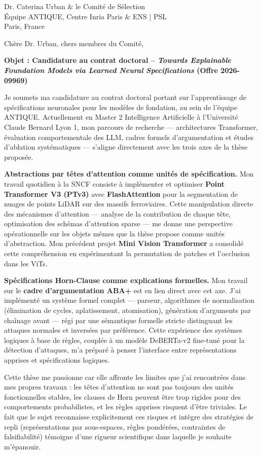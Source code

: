 \documentclass[11pt,a4paper]{letter}
\begin{document}
\begin{letter}{Dr. Caterina Urban \& le Comité de Sélection \\ Équipe ANTIQUE, Centre Inria Paris \& ENS | PSL \\ Paris, France}

\date{\today}

\opening{Chère Dr. Urban, chers membres du Comité,}

\textbf{Objet : Candidature au contrat doctoral – \textit{Towards Explainable Foundation Models via Learned Neural Specifications} (Offre 2026-09969)}

Je soumets ma candidature au contrat doctoral portant sur l'apprentissage de spécifications neuronales pour les modèles de fondation, au sein de l'équipe ANTIQUE. Actuellement en Master 2 Intelligence Artificielle à l'Université Claude Bernard Lyon 1, mon parcours de recherche — architectures Transformer, évaluation comportementale des LLM, cadres formels d'argumentation et études d'ablation systématiques — s'aligne directement avec les trois axes de la thèse proposée.

\textbf{Abstractions par têtes d'attention comme unités de spécification.} Mon travail quotidien à la SNCF consiste à implémenter et optimiser \textbf{Point Transformer V3 (PTv3)} avec \textbf{FlashAttention} pour la segmentation de nuages de points LiDAR sur des massifs ferroviaires. Cette manipulation directe des mécanismes d'attention — analyse de la contribution de chaque tête, optimisation des schémas d'attention sparse — me donne une perspective opérationnelle sur les objets mêmes que la thèse propose comme unités d'abstraction. Mon précédent projet \textbf{Mini Vision Transformer} a consolidé cette compréhension en expérimentant la permutation de patches et l'occlusion dans les ViTs.

\textbf{Spécifications Horn-Clause comme explications formelles.} Mon travail sur le \textbf{cadre d'argumentation ABA+} est en lien direct avec cet axe. J'ai implémenté un système formel complet — parseur, algorithmes de normalisation (élimination de cycles, aplatissement, atomisation), génération d'arguments par chaînage avant — régi par une sémantique formelle stricte distinguant les attaques normales et inversées par préférence. Cette expérience des systèmes logiques à base de règles, couplée à un modèle DeBERTa-v2 fine-tuné pour la détection d'attaques, m'a préparé à penser l'interface entre représentations apprises et spécifications logiques.

Cette thèse me passionne car elle affronte les limites que j'ai rencontrées dans mes propres travaux : les têtes d'attention ne sont pas toujours des unités fonctionnelles stables, les clauses de Horn peuvent être trop rigides pour des comportements probabilistes, et les règles apprises risquent d'être triviales. Le fait que le sujet reconnaisse explicitement ces risques et intègre des stratégies de repli (représentations par sous-espaces, règles pondérées, contraintes de falsifiabilité) témoigne d'une rigueur scientifique dans laquelle je souhaite m'épanouir.


\end{letter}
\end{document}
